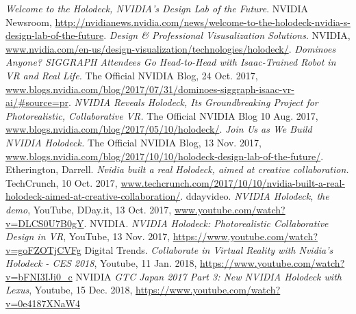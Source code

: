 \documentclass[11pt]{article}
\begin{document}
\newpage
\begin{thebibliography}{10}

\textit{Welcome to the Holodeck, NVIDIA's Design Lab of the Future}. NVIDIA Newsroom, \url{http://nvidianews.nvidia.com/news/welcome-to-the-holodeck-nvidia-s-design-lab-of-the-future}.
\textit{Design \& Professional Visusalization Solutions}. NVIDIA, \url{www.nvidia.com/en-us/design-visualization/technologies/holodeck/}.
\textit{Dominoes Anyone? SIGGRAPH Attendees Go Head-to-Head with Isaac-Trained Robot in VR and Real Life.} The Official NVIDIA Blog, 24 Oct. 2017, \url{www.blogs.nvidia.com/blog/2017/07/31/dominoes-siggraph-isaac-vr-ai/#source=pr}.
\textit{NVIDIA Reveals Holodeck, Its Groundbreaking Project for Photorealistic, Collaborative VR.} 
The Official NVIDIA Blog 10 Aug. 2017, \url{www.blogs.nvidia.com/blog/2017/05/10/holodeck/}.
\textit{Join Us as We Build NVIDIA Holodeck.} The Official NVIDIA Blog, 13 Nov. 2017, \url{www.blogs.nvidia.com/blog/2017/10/10/holodeck-design-lab-of-the-future/}.
Etherington, Darrell. \textit{Nvidia built a real Holodeck, aimed at creative collaboration.} TechCrunch, 10 Oct. 2017, \url{www.techcrunch.com/2017/10/10/nvidia-built-a-real-holodeck-aimed-at-creative-collaboration/}.
ddayvideo. \textit{NVIDIA Holodeck, the demo}, YouTube, DDay.it, 13 Oct. 2017, \url{www.youtube.com/watch?v=DLCS0U7B0gY}.
NVIDIA. \textit{NVIDIA Holodeck: Photorealistic Collaborative Design in VR}, YouTube, 13 Nov. 2017, \url{https://www.youtube.com/watch?v=goFZOTjCVFg}
Digital Trends. \textit{Collaborate in Virtual Reality with Nvidia's Holodeck - CES 2018}, Youtube, 11 Jan. 2018, \url{https://www.youtube.com/watch?v=bFNI3IJi0_c}
NVIDIA \textit{GTC Japan 2017 Part 3: New NVIDIA Holodeck with Lexus}, Youtube, 15 Dec. 2018, \url{https://www.youtube.com/watch?v=0e4187XNaW4}
\end{thebibliography}
\end{document}
